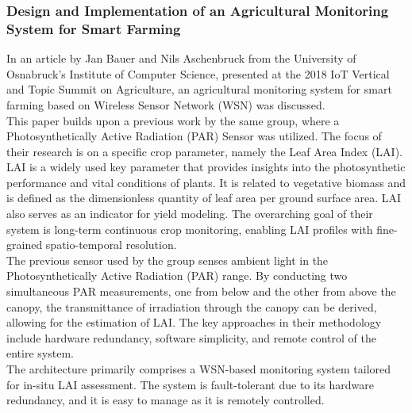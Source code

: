 \documentclass[12pt, a4paper]{article}
\begin{document}
\subsubsection{Design and Implementation of an Agricultural Monitoring System for Smart Farming}
In an article by Jan Bauer and Nils Aschenbruck \cite{8373022} from the University of Osnabruck's Institute of Computer Science, presented at the 2018 IoT Vertical and Topic Summit on Agriculture, an agricultural monitoring system for smart farming based on Wireless Sensor Network (WSN) was discussed.\\
This paper builds upon a previous work by the same group, where a Photosynthetically Active Radiation (PAR) Sensor was utilized. The focus of their research is on a specific crop parameter, namely the Leaf Area Index (LAI). LAI is a widely used key parameter that provides insights into the photosynthetic performance and vital conditions of plants. It is related to vegetative biomass and is defined as the dimensionless quantity of leaf area per ground surface area. LAI also serves as an indicator for yield modeling. The overarching goal of their system is long-term continuous crop monitoring, enabling LAI profiles with fine-grained spatio-temporal resolution.\\
The previous sensor used by the group senses ambient light in the Photosynthetically Active Radiation (PAR) range. By conducting two simultaneous PAR measurements, one from below and the other from above the canopy, the transmittance of irradiation through the canopy can be derived, allowing for the estimation of LAI. The key approaches in their methodology include hardware redundancy, software simplicity, and remote control of the entire system.\\
The architecture primarily comprises a WSN-based monitoring system tailored for in-situ LAI assessment. The system is fault-tolerant due to its hardware redundancy, and it is easy to manage as it is remotely controlled.
\end{document}
